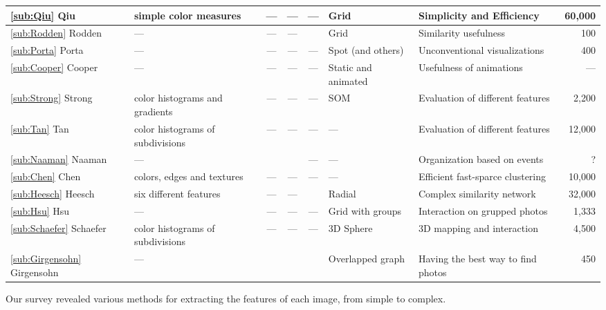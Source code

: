 \begin{table}[ht]
\begin{tabular}{|l|>{\centering}p{2.6cm}|c|c|c|>{\centering}p{2.1cm}|>{\centering}p{2.8cm}|r|}
\hline \ref{sub:Qiu}	Qiu \cite{Qiu:2007p1207}	& simple color measures 			& --- & --- & --- & Grid 			   & Simplicity and Efficiency 			& 60,000	\\
\hline \ref{sub:Rodden} Rodden \cite{Rodden:2001p731}	& --- 								& --- & --- & \cm & Grid 			   & Similarity usefulness	 			& 	 100	\\
\hline \ref{sub:Porta} 	Porta \cite{Porta:2006p416}	& --- 								& --- & --- & --- & Spot (and others)  & Unconventional visualizations		& 	 400	\\
\hline \ref{sub:Cooper} Cooper \cite{Cooper:2006p543}	& --- 								& --- & --- & --- & Static and animated& Usefulness of animations 			& 	 ---	\\
\hline \ref{sub:Strong} Strong \cite{Strong:2009p413}	& color histograms and gradients 	& --- & --- & --- & \ac{SOM} 		   & Evaluation of different features	&  2,200 	\\
\hline \ref{sub:Tan} 	Tan	\cite{Tan:2001p850}		& color histograms of subdivisions & --- & --- & --- & --- 			   & Evaluation of different features 	& 12,000 	\\
\hline \ref{sub:Naaman} Naaman	\cite{Naaman:2004p1802}	& --- 								& \cm & \cm & --- & --- 			   & Organization based on events 		& 	   ?	\\
\hline \ref{sub:Chen} 	Chen	\cite{Chen:1998p2344}	& colors, edges and textures 		& --- & --- & --- & --- 			   & Efficient fast-sparce clustering 	& 10,000 	\\
\hline \ref{sub:Heesch} Heesch	\cite{Heesch:2004p2675} & six different features 			& --- & --- & \cm & Radial 			   & Complex similarity network 		& 32,000 	\\
\hline \ref{sub:Hsu}	Hsu	\cite{Hsu:2009p2696}	& --- 								& --- & --- & --- & Grid with groups   & Interaction on grupped photos 		&  1,333 	\\
\hline \ref{sub:Schaefer} Schaefer \cite{Schaefer:2010p1871} & color histograms of subdivisions & --- & --- & --- & 3D Sphere		   & 3D mapping and interaction 		&  4,500 	\\
\hline \ref{sub:Girgensohn} Girgensohn \cite{Girgensohn:2010}	& --- 								& \cm & \cm & \cm & Overlapped graph   & Having the best way to find photos &    450	\\
\hline
 \end{tabular}
\label{tab:brows-meth}
\end{table}
Our survey revealed various methods for extracting the features of each image, from simple to complex.

